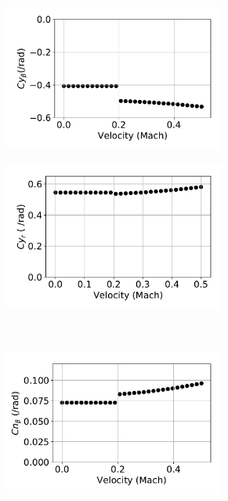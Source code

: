 \begin{figure}[hbt]
	\centering
	\begin{subfigure}[b]{0.49\textwidth}
		\includegraphics[width=0.8\textwidth]{CybetaMachChange}
		\caption{}
		\label{fig:CybetaMachChange}
	\end{subfigure}
	\begin{subfigure}[b]{0.49\textwidth}
		\includegraphics[width=0.8\textwidth]{CyrMachChange}
		\caption{}
		\label{fig:CyrMachChange}
	\end{subfigure}
	\\
	\begin{subfigure}[b]{0.49\textwidth}
		\includegraphics[width=0.8\textwidth]{CnbetaMachChange}

\end{subfigure}
\end{figure}
